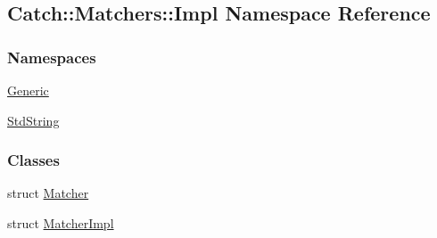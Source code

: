 \hypertarget{a00122}{}\subsection{Catch\+:\+:Matchers\+:\+:Impl Namespace Reference}
\label{a00122}
\subsubsection*{Namespaces}
\begin{DoxyCompactItemize}
\item 
 \hyperlink{a00123}{Generic}
\item 
 \hyperlink{a00124}{Std\+String}
\end{DoxyCompactItemize}
\subsubsection*{Classes}
\begin{DoxyCompactItemize}
\item 
struct \hyperlink{a00047}{Matcher}
\item 
struct \hyperlink{a00048}{Matcher\+Impl}
\end{DoxyCompactItemize}
